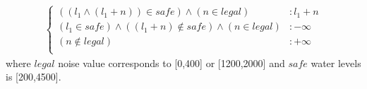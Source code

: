 \begin{itemize}
{\footnotesize
\begin{align*}
\begin{cases}
((l_1 \land (l_1+n)) \in \mathit{safe}) \land (n \in \mathit{legal}) &: l_1 + n\\
(l_1  \in \mathit{safe}) \land  ((l_1+n) \notin \mathit{safe}) \land (n \in \mathit{legal}) &:  -\infty\\
(n \notin \mathit{legal})&: +\infty\\
\end{cases}
\end{align*}
}
where $\mathit{legal}$ noise value corresponds to [0,400] or [1200,2000] and $\mathit{safe}$ water levels is [200,4500]. 


\end{itemize}

